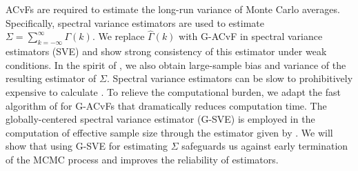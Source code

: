 \documentclass[11pt]{article}
\newcommand{\X}{\mathcal{X}}
\theoremstyle{remark}
\begin{document}
 
ACvFs are required to estimate the long-run variance of Monte Carlo averages. Specifically, spectral variance estimators are used to estimate $\Sigma = \sum_{k=-\infty}^{\infty} \Gamma(k)$. We replace $\hat{\Gamma}(k)$ with G-ACvF in spectral variance estimators (SVE) and show strong consistency of this estimator under weak conditions. In the spirit of \cite{andr:1991}, we also obtain large-sample bias and variance of the resulting estimator of $\Sigma$. Spectral variance estimators can be slow to prohibitively expensive to calculate \citep{liu:fleg:2018}. To relieve the computational burden, we adapt the fast algorithm of \cite{heberle2017fast} for G-ACvFs that dramatically reduces computation time. The globally-centered spectral variance estimator (G-SVE) is employed in the computation of effective sample size through the estimator given by \cite{vats2019multivariate}. We will show that using G-SVE for estimating $\Sigma$ safeguards us against early termination of the MCMC process and improves the reliability of estimators. 



\end{document}
